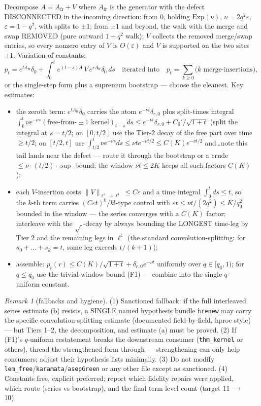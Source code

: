 \documentclass[11pt]{article}
\theoremstyle{plain}
\theoremstyle{remark}
\newtheorem{remark}{Remark}
\newcommand{\eps}{\varepsilon}
\begin{document}
Decompose $A=A_{\mathrm{fr}}+V$ where $A_{\mathrm{fr}}$ is the generator with
the defect DISCONNECTED in the incoming direction: from $0$, holding
$\mathrm{Exp}(\nu)$, $\nu=2q^2\eps$, $\eps=1-q^2$, with splits to $\pm1$; from
$\pm1$ and beyond, the walk with the merge and swap REMOVED (pure outward
$1+q^2$ walk); $V$ collects the removed merge/swap entries, so every nonzero
entry of $V$ is $O(\eps)$ and $V$ is supported on the two sites $\pm1$.
Variation of constants:
\[
  p_t=e^{tA_{\mathrm{fr}}}\delta_0
  +\int_0^t e^{(t-s)A}\,V\,e^{sA_{\mathrm{fr}}}\delta_0\,ds
  \quad\text{iterated into}\quad
  p_t=\sum_{k\ge0}\big(\text{$k$ merge-insertions}\big),
\]
or the single-step form plus a supremum bootstrap --- choose the cleanest.
Key estimates:
\begin{itemize}
\item[(a)] the zeroth term: $e^{tA_{\mathrm{fr}}}\delta_0$ carries the atom
$e^{-\nu t}\delta_{r,0}$ plus split-times integral
$\int_0^t\nu e^{-\nu s}(\text{free-from-}\pm1\text{ kernel})_{t-s}\,ds
\le e^{-\nu t}\delta_{r,0}+C_0'/\sqrt{1+t}$ (split the integral at $s=t/2$;
on $[0,t/2]$ use the Tier-2 decay of the free part over time $\ge t/2$; on
$[t/2,t]$ use $\int_{t/2}^t\nu e^{-\nu s}ds\le\nu te^{-\nu t/2}\le
C(K)e^{-\nu t/2}$ and\dots note this tail lands near the defect --- route it
through the bootstrap or a crude $\le\nu\cdot(t/2)\cdot\sup$-bound; the window
$\nu t\le2K$ keeps all such factors $C(K)$);
\item[(b)] each $V$-insertion costs $\|V\|_{\ell^1\to\ell^1}\le C\eps$ and a
time integral $\int_0^t ds\le t$, so the $k$-th term carries
$(C\eps t)^k/k!$-type control with $\eps t\le\nu t/(2q^2)\le K/q_0^2$ bounded
in the window --- the series converges with a $C(K)$ factor; interleave with
the $\sqrt{\,}$-decay by always bounding the LONGEST time-leg by Tier 2 and
the remaining legs in $\ell^1$ (the standard convolution-splitting: for
$s_0+\dots+s_k=t$, some leg exceeds $t/(k{+}1)$);
\item[(c)] assemble: $p_t(r)\le C(K)/\sqrt{1+t}+\delta_{r,0}e^{-\nu t}$
uniformly over $q\in[q_0,1)$; for $q\le q_0$ use the trivial window bound
(F1) --- combine into the single $q$-uniform constant.
\end{itemize}

\begin{remark}[fallbacks and hygiene]
(1) Sanctioned fallback: if the full interleaved series estimate (b) resists,
a SINGLE named hypothesis bundle \texttt{hrenew} may carry the specific
convolution-splitting estimate (documented field-by-field, hproc style) ---
but Tiers 1--2, the decomposition, and estimate (a) must be proved.
(2) If (F1)'s $q$-uniform restatement breaks the downstream consumer
(\texttt{thm\_kernel} or others), thread the strengthened form through ---
strengthening can only help consumers; adjust their hypothesis lists
minimally.
(3) Do not modify \texttt{lem\_free}/\texttt{karamata}/\texttt{asepGreen} or
any other file except as sanctioned.
(4) Constants free, explicit preferred; report which fidelity repairs were
applied, which route (series vs bootstrap), and the final term-level count
(target 11 $\to$ 10).
\end{remark}
\end{document}
